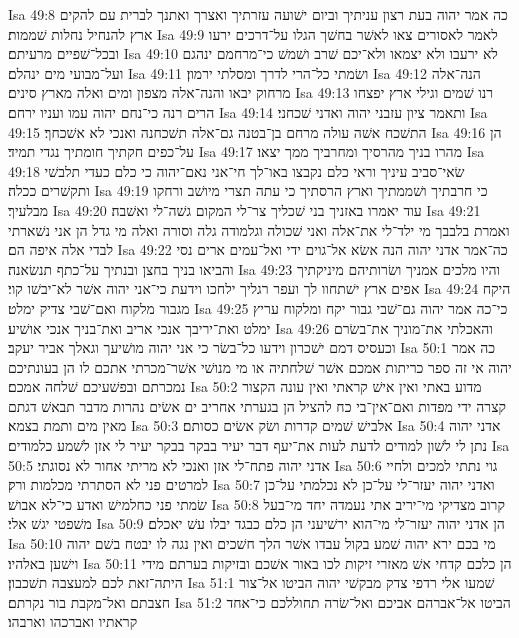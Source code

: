 Isa 49:8  כה אמר יהוה בעת רצון עניתיך וביום ישׁועה עזרתיך ואצרך ואתנך לברית עם להקים ארץ להנחיל נחלות שׁממות׃
Isa 49:9  לאמר לאסורים צאו לאשׁר בחשׁך הגלו על־דרכים ירעו ובכל־שׁפיים מרעיתם׃
Isa 49:10  לא ירעבו ולא יצמאו ולא־יכם שׁרב ושׁמשׁ כי־מרחמם ינהגם ועל־מבועי מים ינהלם׃
Isa 49:11  ושׂמתי כל־הרי לדרך ומסלתי ירמון׃
Isa 49:12  הנה־אלה מרחוק יבאו והנה־אלה מצפון ומים ואלה מארץ סינים׃
Isa 49:13  רנו שׁמים וגילי ארץ יפצחו הרים רנה כי־נחם יהוה עמו ועניו ירחם׃
Isa 49:14  ותאמר ציון עזבני יהוה ואדני שׁכחני׃
Isa 49:15  התשׁכח אשׁה עולה מרחם בן־בטנה גם־אלה תשׁכחנה ואנכי לא אשׁכחך׃
Isa 49:16  הן על־כפים חקתיך חומתיך נגדי תמיד׃
Isa 49:17  מהרו בניך מהרסיך ומחרביך ממך יצאו׃
Isa 49:18  שׂאי־סביב עיניך וראי כלם נקבצו באו־לך חי־אני נאם־יהוה כי כלם כעדי תלבשׁי ותקשׁרים ככלה׃
Isa 49:19  כי חרבתיך ושׁממתיך וארץ הרסתיך כי עתה תצרי מיושׁב ורחקו מבלעיך׃
Isa 49:20  עוד יאמרו באזניך בני שׁכליך צר־לי המקום גשׁה־לי ואשׁבה׃
Isa 49:21  ואמרת בלבבך מי ילד־לי את־אלה ואני שׁכולה וגלמודה גלה וסורה ואלה מי גדל הן אני נשׁארתי לבדי אלה איפה הם׃
Isa 49:22  כה־אמר אדני יהוה הנה אשׂא אל־גוים ידי ואל־עמים ארים נסי והביאו בניך בחצן ובנתיך על־כתף תנשׂאנה׃
Isa 49:23  והיו מלכים אמניך ושׂרותיהם מיניקתיך אפים ארץ ישׁתחוו לך ועפר רגליך ילחכו וידעת כי־אני יהוה אשׁר לא־יבשׁו קוי׃
Isa 49:24  היקח מגבור מלקוח ואם־שׁבי צדיק ימלט׃
Isa 49:25  כי־כה אמר יהוה גם־שׁבי גבור יקח ומלקוח עריץ ימלט ואת־יריבך אנכי אריב ואת־בניך אנכי אושׁיע׃
Isa 49:26  והאכלתי את־מוניך את־בשׂרם וכעסיס דמם ישׁכרון וידעו כל־בשׂר כי אני יהוה מושׁיעך וגאלך אביר יעקב׃
Isa 50:1  כה אמר יהוה אי זה ספר כריתות אמכם אשׁר שׁלחתיה או מי מנושׁי אשׁר־מכרתי אתכם לו הן בעונתיכם נמכרתם ובפשׁעיכם שׁלחה אמכם׃
Isa 50:2  מדוע באתי ואין אישׁ קראתי ואין עונה הקצור קצרה ידי מפדות ואם־אין־בי כח להציל הן בגערתי אחריב ים אשׂים נהרות מדבר תבאשׁ דגתם מאין מים ותמת בצמא׃
Isa 50:3  אלבישׁ שׁמים קדרות ושׂק אשׂים כסותם׃
Isa 50:4  אדני יהוה נתן לי לשׁון למודים לדעת לעות את־יעף דבר יעיר בבקר בבקר יעיר לי אזן לשׁמע כלמודים׃
Isa 50:5  אדני יהוה פתח־לי אזן ואנכי לא מריתי אחור לא נסוגתי׃
Isa 50:6  גוי נתתי למכים ולחיי למרטים פני לא הסתרתי מכלמות ורק׃
Isa 50:7  ואדני יהוה יעזר־לי על־כן לא נכלמתי על־כן שׂמתי פני כחלמישׁ ואדע כי־לא אבושׁ׃
Isa 50:8  קרוב מצדיקי מי־יריב אתי נעמדה יחד מי־בעל משׁפטי יגשׁ אלי׃
Isa 50:9  הן אדני יהוה יעזר־לי מי־הוא ירשׁיעני הן כלם כבגד יבלו עשׁ יאכלם׃
Isa 50:10  מי בכם ירא יהוה שׁמע בקול עבדו אשׁר הלך חשׁכים ואין נגה לו יבטח בשׁם יהוה וישׁען באלהיו׃
Isa 50:11  הן כלכם קדחי אשׁ מאזרי זיקות לכו באור אשׁכם ובזיקות בערתם מידי היתה־זאת לכם למעצבה תשׁכבון׃
Isa 51:1  שׁמעו אלי רדפי צדק מבקשׁי יהוה הביטו אל־צור חצבתם ואל־מקבת בור נקרתם׃
Isa 51:2  הביטו אל־אברהם אביכם ואל־שׂרה תחוללכם כי־אחד קראתיו ואברכהו וארבהו׃
